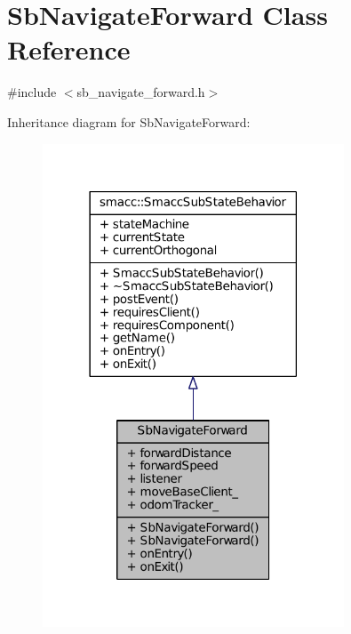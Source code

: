 \hypertarget{classSbNavigateForward}{}\section{Sb\+Navigate\+Forward Class Reference}
\label{classSbNavigateForward}


{\ttfamily \#include $<$sb\+\_\+navigate\+\_\+forward.\+h$>$}



Inheritance diagram for Sb\+Navigate\+Forward\+:
\nopagebreak
\begin{figure}[H]
\begin{center}
\leavevmode
\includegraphics[width=254pt]{classSbNavigateForward__inherit__graph}
\end{center}
\end{figure}



